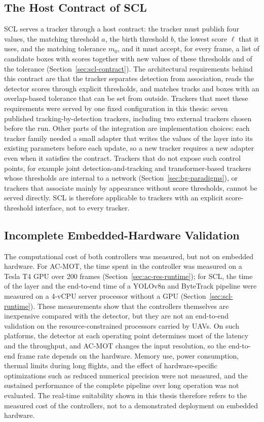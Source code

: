 \subsection{The Host Contract of SCL}\label{sec:lim-contract}
SCL serves a tracker through a host contract: the tracker must publish four values, the matching threshold $a$, the birth threshold $b$, the lowest score $\ell$ that it uses, and the matching tolerance $m_0$, and it must accept, for every frame, a list of candidate boxes with scores together with new values of these thresholds and of the tolerance (Section~\ref{sec:scl-contract}). The architectural requirements behind this contract are that the tracker separates detection from association, reads the detector scores through explicit thresholds, and matches tracks and boxes with an overlap-based tolerance that can be set from outside. Trackers that meet these requirements were served by one fixed configuration in this thesis: seven published tracking-by-detection trackers, including two external trackers chosen before the run. Other parts of the integration are implementation choices: each tracker family needed a small adapter that writes the values of the layer into its existing parameters before each update, so a new tracker requires a new adapter even when it satisfies the contract. Trackers that do not expose such control points, for example joint detection-and-tracking and transformer-based trackers whose thresholds are internal to a network (Section~\ref{sec:bg-paradigms}), or trackers that associate mainly by appearance without score thresholds, cannot be served directly. SCL is therefore applicable to trackers with an explicit score-threshold interface, not to every tracker.

\subsection{Incomplete Embedded-Hardware Validation}\label{sec:lim-hardware}
The computational cost of both controllers was measured, but not on embedded hardware. For AC-MOT, the time spent in the controller was measured on a Tesla T4 GPU over 200 frames (Section~\ref{sec:ac-res-runtime}); for SCL, the time of the layer and the end-to-end time of a YOLOv8n and ByteTrack pipeline were measured on a 4-vCPU server processor without a GPU (Section~\ref{sec:scl-runtime}). These measurements show that the controllers themselves are inexpensive compared with the detector, but they are not an end-to-end validation on the resource-constrained processors carried by UAVs. On such platforms, the detector at each operating point determines most of the latency and the throughput, and AC-MOT changes the input resolution, so the end-to-end frame rate depends on the hardware. Memory use, power consumption, thermal limits during long flights, and the effect of hardware-specific optimizations such as reduced numerical precision were not measured, and the sustained performance of the complete pipeline over long operation was not evaluated. The real-time suitability shown in this thesis therefore refers to the measured cost of the controllers, not to a demonstrated deployment on embedded hardware.

